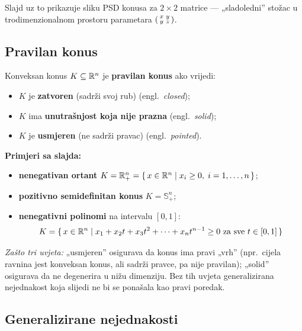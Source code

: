 Slajd uz to prikazuje sliku PSD konusa za $2\times2$ matrice --- „sladoledni”
stožac u trodimenzionalnom prostoru parametara
$\begin{psmallmatrix}x & y\\ y & z\end{psmallmatrix}$.

\subsection{Pravilan konus}

\begin{definicija}
Konveksan konus $K \subseteq \mathbb{R}^n$ je \textbf{pravilan konus} ako vrijedi:
\begin{itemize}
  \item $K$ je \textbf{zatvoren} (sadrži svoj rub) (engl.\ \emph{closed});
  \item $K$ ima \textbf{unutrašnjost koja nije prazna} (engl.\ \emph{solid});
  \item $K$ je \textbf{usmjeren} (ne sadrži pravac) (engl.\ \emph{pointed}).
\end{itemize}
\end{definicija}

\textbf{Primjeri sa slajda:}

\begin{itemize}
  \item \textbf{nenegativan ortant}
        $K = \mathbb{R}^n_+ = \{\, x \in \mathbb{R}^n \mid x_i \ge 0,\; i = 1,\dots,n \,\}$;
  \item \textbf{pozitivno semidefinitan konus} $K = \mathbb{S}^n_+$;
  \item \textbf{nenegativni polinomi} na intervalu $[0,1]$:
        \[
        K = \{\, x \in \mathbb{R}^n \mid x_1 + x_2t + x_3t^2 + \dots + x_nt^{n-1} \ge 0
        \text{ za sve } t \in [0,1] \,\}
        \]
\end{itemize}

\emph{Zašto tri uvjeta:} „usmjeren” osigurava da konus ima pravi „vrh” (npr.\
cijela ravnina jest konveksan konus, ali sadrži pravce, pa nije pravilan);
„solid” osigurava da ne degenerira u nižu dimenziju. Bez tih uvjeta
generalizirana nejednakost koja slijedi ne bi se ponašala kao pravi poredak.

\subsection{Generalizirane nejednakosti}

